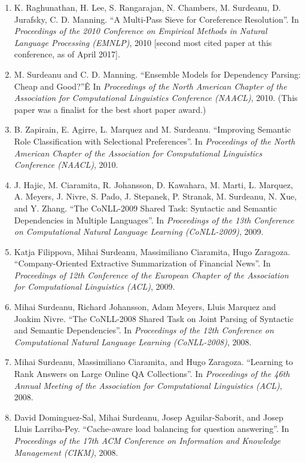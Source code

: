 \documentclass[10pt]{article}
\newcommand{\ve}[1]{{\em #1}} %
\newcommand{\ti}[1]{``#1''} %
\begin{document}
\begin{description}
\begin{enumerate}
\item
K. Raghunathan, H. Lee, S. Rangarajan, N. Chambers, M. Surdeanu, D. Jurafsky, C. D. Manning.  \ti{A Multi-Pass Sieve for Coreference Resolution}. In \ve{Proceedings of the 2010 Conference on Empirical Methods in Natural Language Processing (EMNLP)}, 2010 [second most cited paper at this conference, as of April 2017].

\item
M. Surdeanu and C. D. Manning.  \ti{Ensemble Models for Dependency Parsing: Cheap and Good?}Ê In \ve{Proceedings of the North American Chapter of the Association for Computational Linguistics Conference (NAACL)}, 2010. (This paper was a finalist for the best short paper award.)

\item
B. Zapirain, E. Agirre, L. Marquez and M. Surdeanu.  \ti{Improving Semantic Role Classification with Selectional Preferences}.  In \ve{Proceedings of the North American Chapter of the Association for Computational Linguistics Conference (NAACL)}, 2010.

\item
J. Hajic, M. Ciaramita, R. Johansson, D. Kawahara, M. Marti, L. Marquez, A. Meyers, J. Nivre, S. Pado, J. Stepanek, P. Stranak, M. Surdeanu, N. Xue, and Y. Zhang.  \ti{The CoNLL-2009 Shared Task: Syntactic and Semantic Dependencies in Multiple Languages}.  In \ve{Proceedings of the 13th Conference on Computational Natural Language Learning (CoNLL-2009)}, 2009.

\item
Katja Filippova, Mihai Surdeanu, Massimiliano Ciaramita, Hugo Zaragoza.  \ti{Company-Oriented Extractive Summarization of Financial News}.  In \ve{Proceedings of 12th Conference of the European Chapter of the Association for Computational Linguistics (ACL)}, 2009.

\item
Mihai Surdeanu, Richard Johansson, Adam Meyers, Lluis Marquez and Joakim Nivre.  \ti{The CoNLL-2008 Shared Task on Joint Parsing of Syntactic and Semantic Dependencies}.  In \ve{Proceedings of the 12th Conference on Computational Natural Language Learning (CoNLL-2008)}, 2008.

\item
Mihai Surdeanu, Massimiliano Ciaramita, and Hugo Zaragoza.  \ti{Learning to Rank Answers on Large Online QA Collections}.  In \ve{Proceedings of the 46th Annual Meeting of the Association for Computational Linguistics (ACL)}, 2008. 

\item
David Dominguez-Sal, Mihai Surdeanu, Josep Aguilar-Saborit, and Josep Lluis Larriba-Pey.  \ti{Cache-aware load balancing for question answering}.  In \ve{Proceedings of the 17th ACM Conference on Information and Knowledge Management (CIKM)}, 2008. 


\end{enumerate}
\end{description}
\end{document}

